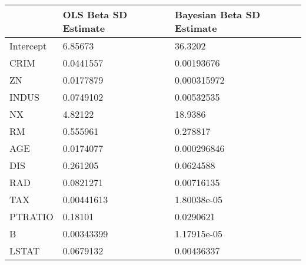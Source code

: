 \begin{tabular}{lll}
\hline
           & OLS Beta SD Estimate   & Bayesian Beta SD Estimate   \\
\hline
 Intercept & 6.85673                & 36.3202                     \\
 CRIM      & 0.0441557              & 0.00193676                  \\
 ZN        & 0.0177879              & 0.000315972                 \\
 INDUS     & 0.0749102              & 0.00532535                  \\
 NX        & 4.82122                & 18.9386                     \\
 RM        & 0.555961               & 0.278817                    \\
 AGE       & 0.0174077              & 0.000296846                 \\
 DIS       & 0.261205               & 0.0624588                   \\
 RAD       & 0.0821271              & 0.00716135                  \\
 TAX       & 0.00441613             & 1.80038e-05                 \\
 PTRATIO   & 0.18101                & 0.0290621                   \\
 B         & 0.00343399             & 1.17915e-05                 \\
 LSTAT     & 0.0679132              & 0.00436337                  \\
\hline
\end{tabular}